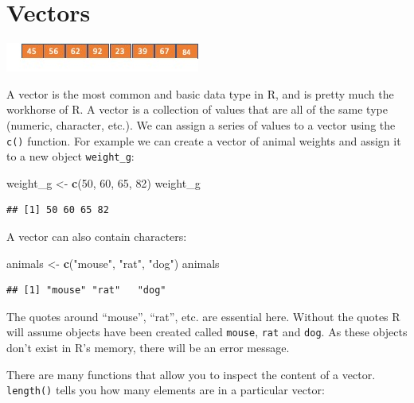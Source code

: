 \documentclass[
]{book}
\newenvironment{Shaded}{\begin{snugshade}}{\end{snugshade}}
\newcommand{\DecValTok}[1]{\textcolor[rgb]{0.00,0.00,0.81}{#1}}
\newcommand{\FunctionTok}[1]{\textcolor[rgb]{0.13,0.29,0.53}{\textbf{#1}}}
\newcommand{\NormalTok}[1]{#1}
\newcommand{\OtherTok}[1]{\textcolor[rgb]{0.56,0.35,0.01}{#1}}
\newcommand{\StringTok}[1]{\textcolor[rgb]{0.31,0.60,0.02}{#1}}
\begin{document}
\section{Vectors}\label{vectors}

\includegraphics{vec1.jpg}

A vector is the most common and basic data type in R, and is pretty much the workhorse of R. A vector is a collection of values that are all of the same type (numeric, character, etc.). We can assign a series of values to a vector using the \texttt{c()} function. For example we can create a vector of animal weights and assign it to a new object \texttt{weight\_g}:

\begin{Shaded}
\begin{Highlighting}[]
\NormalTok{weight\_g }\OtherTok{\textless{}{-}} \FunctionTok{c}\NormalTok{(}\DecValTok{50}\NormalTok{, }\DecValTok{60}\NormalTok{, }\DecValTok{65}\NormalTok{, }\DecValTok{82}\NormalTok{)}
\NormalTok{weight\_g}
\end{Highlighting}
\end{Shaded}

\begin{verbatim}
## [1] 50 60 65 82
\end{verbatim}

A vector can also contain characters:

\begin{Shaded}
\begin{Highlighting}[]
\NormalTok{animals }\OtherTok{\textless{}{-}} \FunctionTok{c}\NormalTok{(}\StringTok{"mouse"}\NormalTok{, }\StringTok{"rat"}\NormalTok{, }\StringTok{"dog"}\NormalTok{)}
\NormalTok{animals}
\end{Highlighting}
\end{Shaded}

\begin{verbatim}
## [1] "mouse" "rat"   "dog"
\end{verbatim}

The quotes around ``mouse'', ``rat'', etc. are essential here. Without the quotes R will assume objects have been created called \texttt{mouse}, \texttt{rat} and \texttt{dog}. As these objects don't exist in R's memory, there will be an error message.

There are many functions that allow you to inspect the content of a vector. \texttt{length()} tells you how many elements are in a particular vector:
\end{document}
